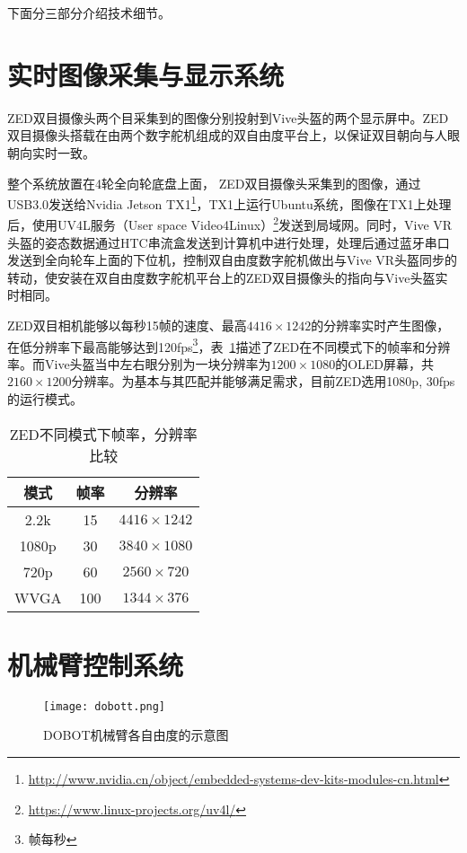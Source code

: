 下面分三部分介绍技术细节。

\section{实时图像采集与显示系统}
ZED双目摄像头两个目采集到的图像分别投射到Vive头盔的两个显示屏中。ZED双目摄像头搭载在由两个数字舵机组成的双自由度平台上，以保证双目朝向与人眼朝向实时一致。

整个系统放置在4轮全向轮底盘上面， ZED双目摄像头采集到的图像，通过USB3.0发送给Nvidia Jetson TX1\footnote{\url{http://www.nvidia.cn/object/embedded-systems-dev-kits-modules-cn.html}}，TX1上运行Ubuntu系统，图像在TX1上处理后，使用UV4L服务（User space Video4Linux）\footnote{\url{https://www.linux-projects.org/uv4l/}}发送到局域网。同时，Vive VR头盔的姿态数据通过HTC串流盒发送到计算机中进行处理，处理后通过蓝牙串口发送到全向轮车上面的下位机，控制双自由度数字舵机做出与Vive VR头盔同步的转动，使安装在双自由度数字舵机平台上的ZED双目摄像头的指向与Vive头盔实时相同。

ZED双目相机能够以每秒15帧的速度、最高$4416\times1242$的分辨率实时产生图像，在低分辨率下最高能够达到120fps\footnote{帧每秒}，表~\ref{zhenlv}描述了ZED在不同模式下的帧率和分辨率。而Vive头盔当中左右眼分别为一块分辨率为$1200\times1080$的OLED屏幕，共$2160\times1200$分辨率。为基本与其匹配并能够满足需求，目前ZED选用1080p, 30fps的运行模式。

\begin{table}[htbp]
	\centering
	\caption{ZED不同模式下帧率，分辨率比较}
	\begin{tabular}{ccc}
		\toprule
		模式    & 帧率    & 分辨率 \\
		\midrule
		2.2k  & 15    & $4416\times1242$ \\
		\midrule
		1080p & 30    & $3840\times1080$ \\
		\midrule
		720p  & 60    & $2560\times720$ \\
		\midrule
		WVGA  & 100   & $1344\times376$ \\
		\bottomrule
	\end{tabular}%
\label{zhenlv}
\end{table}%


\section{机械臂控制系统}

\begin{figure}[htbp]
\small
\centering
\texttt{[image: dobott.png]}
\caption{DOBOT机械臂各自由度的示意图} 
\label{dobott}
\end{figure}

